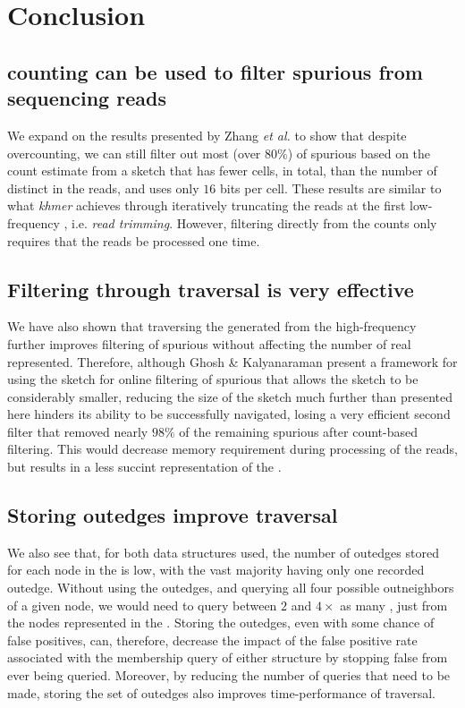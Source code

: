 \chapter{Conclusion}

\section{ \kmer counting can be used to filter spurious  from sequencing reads}

We expand on the results presented by Zhang \emph{et al.} \cite{Zhang2014} to show that despite overcounting, we can still filter out most (over $80\%$) of spurious  based on the count estimate from a \cm sketch that has fewer cells, in total, than the number of distinct  in the reads, and uses only $16$ bits per cell. These results are similar to what \emph{khmer} achieves through iteratively truncating the reads at the first low-frequency \kmer \cite{Zhang2014}, i.e. \emph{read trimming}. However, filtering directly from the counts only requires that the reads be processed one time.

\section{Filtering through traversal is very effective}

We have also shown that traversing the \dBG generated from the high-frequency  further improves filtering of spurious  without affecting the number of real  represented. Therefore, although Ghosh \& Kalyanaraman \cite{Ghosh2019} present a framework for using the \cm sketch for online filtering of spurious  that allows the sketch to be considerably smaller, reducing the size of the \cm sketch much further than presented here hinders its ability to be successfully navigated, losing a very efficient second filter that removed nearly $98\%$ of the remaining spurious  after count-based filtering. This would decrease memory requirement during processing of the reads, but results in a less succint representation of the \dBG.

\section{Storing outedges improve traversal}

We also see that, for both data structures used, the number of outedges stored for each node in the \dBG is low, with the vast majority having only one recorded outedge. Without using the outedges, and querying all four possible outneighbors of a given node, we would need to query between $2$ and $4\times$ as many , just from the nodes represented in the \dBG. Storing the outedges, even with some chance of false positives, can, therefore, decrease the impact of the false positive rate associated with the membership query of either structure by stopping false  from ever being queried. Moreover, by reducing the number of queries that need to be made, storing the set of outedges also improves time-performance of traversal.

